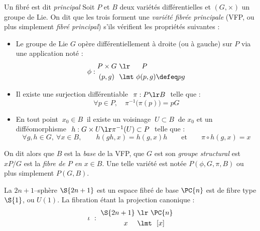 \begin{definition}
	Un fibré est dit \emph{principal}
	Soit $P$ et $B$ deux variétés différentielles et $(G,\times)$ un groupe de Lie. On dit que les trois forment une \emph{variété fibrée principale} (VFP, ou plus simplement \emph{fibré principal}) s'ils vérifient les propriétés suivantes :
	\begin{itemize}
		\item Le groupe de Lie $G$ opère différentiellement à droite (ou à gauche) sur $P$ via une application noté :
		\[\phi : \begin{aligned}P\times G\ &\lr\quad\ \ P \\ (p,g)\ \ &\lmt\ \phi(p,g)\defeq pg
		\end{aligned}\]
		
		\item Il existe une surjection différentiable $\ \pi:P\lr B\ $ telle que :
		\[\forall p\in P,\quad \pi^{-1}\big(\pi(p)\big)=pG\]
		
		\item En tout point $\ x_0\in B\ $ il existe un voisinage $\ U\subset B\ $ de $x_0$ et un difféomorphisme $\ h:G\times U\lr \pi^{-1}(U)\subset P\ $ telle que :
		\[\forall g,h\in G,\ \forall x\in B,\qquad h(gh,x) = h(g,x)h\qquad \text{et} \qquad \pi\circ h(g,x)=x\]
	\end{itemize}
	On dit alors que $B$ est la \emph{base} de la VFP, que $G$ est son \emph{groupe structural} est $xP/G$ est la \emph{fibre de $P$ en} $x\in B$. Une telle variété est notée $P(\phi, G, \pi, B)$ ou plus simplement $P(G,B)$.
\end{definition}

\begin{proposition}
	La $2n+1$--sphère $\S{2n+1}$ est un espace fibré de base $\PC{n}$ est de fibre type $\S{1}$, ou $U(1)$. La fibration étant la projection canonique :
	\[\iota\ :\ \begin{aligned}\S{2n+1}\ &\lr\ \PC{n} \\ x\quad\ &\lmt\ \ [x]\end{aligned}\]
\end{proposition}



